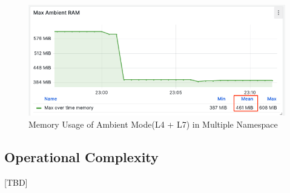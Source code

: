\begin{figure}[H]
  \centering
  \includegraphics[width=0.85\linewidth]{resources/ambient-multi-ns-l4-l7-mem.png}
  \caption{Memory Usage of Ambient Mode(L4 + L7) in Multiple Namespace}
\end{figure}


\subsection{Operational Complexity}
[TBD]
